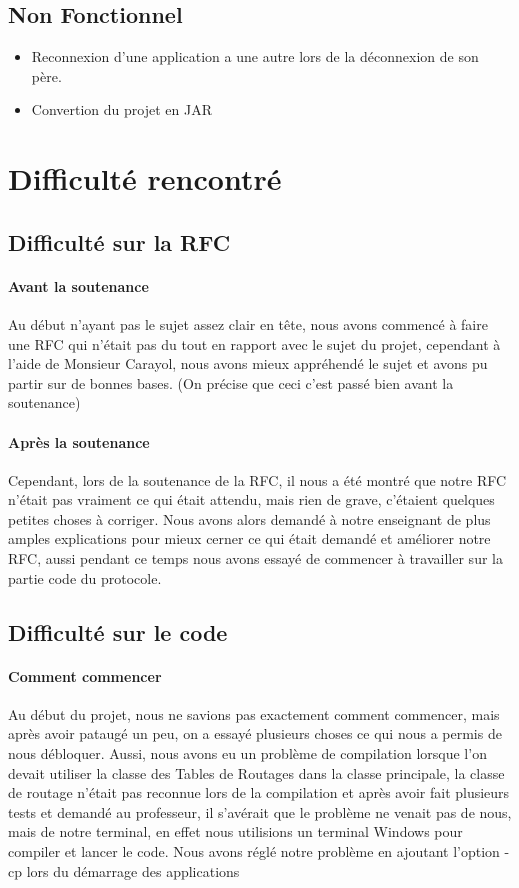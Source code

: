 \documentclass[a4paper,titlepage]{report}
\begin{document}
\subsection{Non Fonctionnel}
\begin{itemize}
\item Reconnexion d'une application a une autre lors de la déconnexion de son père.
\item Convertion du projet en JAR
\end{itemize}




\pagebreak
\section{Difficulté rencontré}
\subsection{Difficulté sur la RFC}
\paragraph{Avant la soutenance}
Au début n'ayant pas le sujet assez clair en tête, nous avons commencé à faire une RFC qui n'était pas du tout en rapport avec le sujet du projet, cependant à l'aide de Monsieur Carayol, nous avons mieux appréhendé le sujet et avons pu partir sur de bonnes bases. (On précise que ceci c'est passé bien avant la soutenance)
\paragraph{Après la soutenance}
Cependant, lors de la soutenance de la RFC, il nous a été montré que notre RFC n'était pas vraiment ce qui était attendu, mais rien de grave, c'étaient quelques petites choses à corriger.
Nous avons alors demandé à notre enseignant de plus amples explications pour mieux cerner ce qui était demandé et améliorer notre RFC, aussi pendant ce temps nous avons essayé de commencer à travailler sur la partie code du protocole.
\subsection{Difficulté sur le code}
\paragraph{Comment commencer}
Au début du projet, nous ne savions pas exactement comment commencer, mais après avoir pataugé un peu, on a essayé plusieurs choses ce qui nous a permis  de nous débloquer.
Aussi, nous avons eu un problème de compilation lorsque l'on devait utiliser la classe des Tables de Routages dans la classe principale, la classe de routage n'était pas reconnue lors de la compilation et après avoir fait plusieurs tests et demandé au professeur, il s'avérait que le problème ne venait pas de nous, mais de notre terminal, en effet nous utilisions un terminal Windows pour compiler et lancer le code.
Nous avons réglé notre problème en ajoutant l'option -cp lors du démarrage des applications
\end{document}
